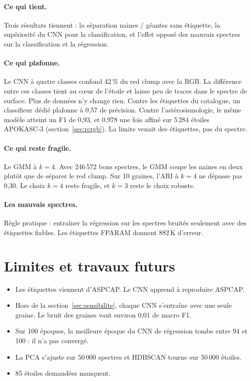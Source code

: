 \documentclass[11pt,a4paper]{article}
\begin{document}
\paragraph{Ce qui tient.} Trois résultats tiennent : la séparation naines / géantes sans étiquette, la supériorité du CNN pour la classification, et l'effet opposé des mauvais spectres sur la classification et la régression.

\paragraph{Ce qui plafonne.} Le CNN à quatre classes confond 42\,\% du red clump avec la RGB. La différence entre ces classes tient au cœur de l'étoile et laisse peu de traces dans le spectre de surface. Plus de données n'y change rien. Contre les étiquettes du catalogue, un classifieur dédié plafonne à 0,57 de précision. Contre l'astérosismologie, le même modèle atteint un F1 de 0,93, et 0,978 une fois affiné sur 5\,284 étoiles APOKASC-3 (section~\ref{sec:rcrgb}). La limite venait des étiquettes, pas du spectre.

\paragraph{Ce qui reste fragile.} Le GMM à $k = 4$. Avec 246\,572 bons spectres, le GMM coupe les naines en deux plutôt que de séparer le red clump. Sur 10 graines, l'ARI à $k = 4$ ne dépasse pas 0,30. Le choix $k = 4$ reste fragile, et $k = 3$ reste le choix robuste.

\paragraph{Les mauvais spectres.} Règle pratique : entraîner la régression sur les spectres bruités seulement avec des étiquettes fiables. Les étiquettes FPARAM donnent 882\,K d'erreur.

\section{Limites et travaux futurs}

\begin{itemize}
  \item Les étiquettes viennent d'ASPCAP. Le CNN apprend à reproduire ASPCAP.
  \item Hors de la section~\ref{sec:sensibilite}, chaque CNN s'entraîne avec une seule graine. Le bruit des graines vaut environ 0,01 de macro F1.
  \item Sur 100 époques, la meilleure époque du CNN de régression tombe entre 94 et 100 : il n'a pas convergé.
  \item La PCA s'ajuste sur 50\,000 spectres et HDBSCAN tourne sur 50\,000 étoiles.
  \item 85 étoiles demandées manquent.
\end{itemize}
\end{document}
